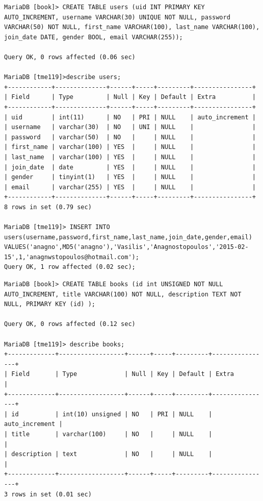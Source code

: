 \documentclass{assignment}
\begin{document}
\begin{verbatim}
MariaDB [book]> CREATE TABLE users (uid INT PRIMARY KEY AUTO_INCREMENT, username VARCHAR(30) UNIQUE NOT NULL, password VARCHAR(50) NOT NULL, first_name VARCHAR(100), last_name VARCHAR(100), join_date DATE, gender BOOL, email VARCHAR(255));

Query OK, 0 rows affected (0.06 sec)

MariaDB [tme119]>describe users;
+------------+--------------+------+-----+---------+----------------+
| Field      | Type         | Null | Key | Default | Extra          |
+------------+--------------+------+-----+---------+----------------+
| uid        | int(11)      | NO   | PRI | NULL    | auto_increment |
| username   | varchar(30)  | NO   | UNI | NULL    |                |
| password   | varchar(50)  | NO   |     | NULL    |                |
| first_name | varchar(100) | YES  |     | NULL    |                |
| last_name  | varchar(100) | YES  |     | NULL    |                |
| join_date  | date         | YES  |     | NULL    |                |
| gender     | tinyint(1)   | YES  |     | NULL    |                |
| email      | varchar(255) | YES  |     | NULL    |                |
+------------+--------------+------+-----+---------+----------------+
8 rows in set (0.79 sec)

MariaDB [tme119]> INSERT INTO users(username,password,first_name,last_name,join_date,gender,email) VALUES('anagno',MD5('anagno'),'Vasilis','Anagnostopoulos','2015-02-15',1,'anagnwstopoulos@hotmail.com');
Query OK, 1 row affected (0.02 sec);
\end{verbatim}

\begin{verbatim}
MariaDB [book]> CREATE TABLE books (id int UNSIGNED NOT NULL AUTO_INCREMENT, title VARCHAR(100) NOT NULL, description TEXT NOT NULL, PRIMARY KEY (id) );

Query OK, 0 rows affected (0.12 sec)

MariaDB [tme119]> describe books;
+-------------+------------------+------+-----+---------+----------------+
| Field       | Type             | Null | Key | Default | Extra          |
+-------------+------------------+------+-----+---------+----------------+
| id          | int(10) unsigned | NO   | PRI | NULL    | auto_increment |
| title       | varchar(100)     | NO   |     | NULL    |                |
| description | text             | NO   |     | NULL    |                |
+-------------+------------------+------+-----+---------+----------------+
3 rows in set (0.01 sec)
\end{verbatim}
\end{document}
